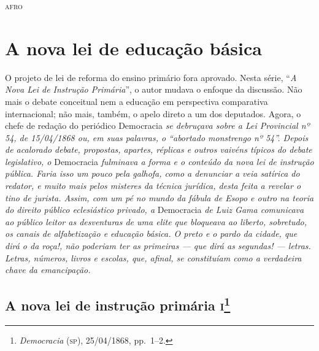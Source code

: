 \begin{flushright}
\textsc{afro}
\end{flushright}

\part{A nova lei de educação básica}

\begin{argumento}
O projeto de lei de reforma do ensino primário fora aprovado. Nesta
série, ``\emph{A Nova Lei de Instrução Primária}'', o autor mudava o
enfoque da discussão. Não mais o debate conceitual nem a educação em
perspectiva comparativa internacional; não mais, também, o apelo direto
a um dos deputados. Agora, o chefe de redação do periódico Democracia
\emph{se debruçava sobre a Lei Provincial nº 54, de 15/04/1868 ou, em
suas palavras, o ``abortado monstrengo nº 54''. Depois de acalorado
debate, propostas, apartes, réplicas e outros vaivéns típicos do debate
legislativo, o} Democracia \emph{fulminava a forma e o conteúdo da nova
lei de instrução pública. Faria isso um pouco pela galhofa, como a
denunciar a veia satírica do redator, e muito mais pelos misteres da
técnica jurídica, desta feita a revelar o tino de jurista. Assim, com um
pé no mundo da fábula de Esopo e outro na teoria do direito público
eclesiástico privado, a} Democracia \emph{de Luiz Gama comunicava ao
público leitor as desventuras de uma elite que bloqueava ao liberto,
sobretudo, os canais de alfabetização e educação básica. O preto e o
pardo da cidade, que dirá o da roça!, não poderiam ter as primeiras ---
que dirá as segundas! --- letras. Letras, números, livros e escolas, que,
afinal, se constituíam como a verdadeira chave da emancipação.}
\end{argumento}

\chapter{A nova lei de instrução primária \textsc{i}\footnote{\emph{Democracia} (\textsc{sp}), 25/04/1868, pp.~1--2.}}

